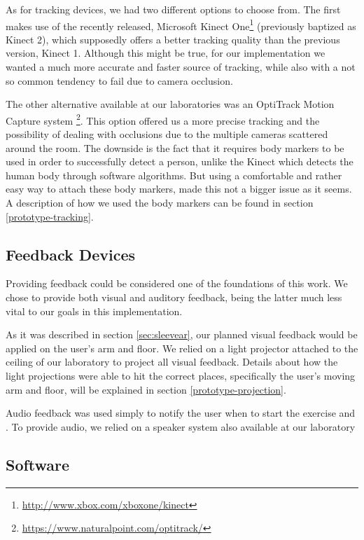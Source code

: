 As for tracking devices, we had two different options to choose from.
The first makes use of the recently released, Microsoft Kinect One\footnote{\url{http://www.xbox.com/xboxone/kinect}} 
(previously baptized as Kinect 2), which supposedly offers a better tracking quality than 
the previous version, Kinect 1. Although this might be true, for our implementation we wanted a much more accurate and faster source of tracking, while also with a not so common tendency to fail due to camera occlusion.

The other alternative available at our laboratories was an OptiTrack Motion Capture system \footnote{\url{https://www.naturalpoint.com/optitrack/}}. 
This option offered us a more precise tracking and the possibility of dealing with occlusions due to the multiple cameras scattered around the room. 
The downside is the fact that it requires body markers to be used in order to successfully detect a person, unlike the 
Kinect which detects the human body through software algorithms. 
But using a comfortable and rather easy way to attach these body markers, made this not a bigger issue as it seems. 
A description of how we used the body markers can be found in section \ref{prototype-tracking}.



\subsection{Feedback Devices}

Providing feedback could be considered one of the foundations of this work. 
We chose to provide both visual and auditory feedback, being the latter much less vital to our goals in this implementation.

As it was described in section \ref{sec:sleevear}, our planned visual feedback would be applied on the user's arm and floor.
We relied on a light projector attached to the ceiling of our laboratory to project all visual feedback.
Details about how the light projections were able to hit the correct places, specifically the user's moving arm and floor, will be explained in section \ref{prototype-projection}.

Audio feedback was used simply to notify the user when to start the exercise and .
To provide audio, we relied on a speaker system also available at our laboratory

\subsection{Software}

